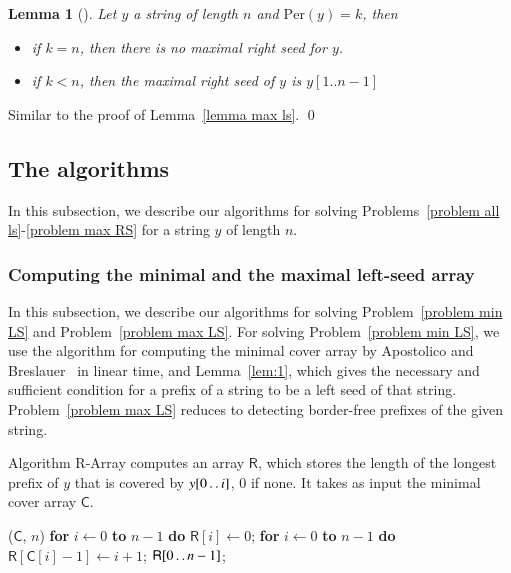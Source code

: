 \documentclass[preprint,12pt]{elsarticle}
\newcommand{\dd}{\mathinner{\ldotp\ldotp}}
\newcommand{\carr}{\textsf{C}}      %
\newcommand{\rarr}{\textsf{R}}      %
\newcommand{\Per}[1]{\ensuremath{\mathrm{Per}(#1)}}
\newtheorem{lemma}[theorem]{Lemma}
\newenvironment{proof}[1][Proof]{\begin{trivlist}
\item[\hskip \labelsep {\bfseries #1}]}{\end{trivlist}}
\begin{document}
\begin{lemma}[\cite{COCOON_2011}]
\label{lemma max rs}
Let $y$ a string of length $n$ and $\Per{y} = k$, then
\begin{itemize}
 \item if $k=n$, then there is no maximal right seed for $y$.
 \item if $k<n$, then the maximal right seed of $y$ is $y[1..n-1]$
\end{itemize}
\end{lemma}
\begin{proof}
Similar to the proof of Lemma~\ref{lemma max ls}. \qed
\end{proof}



\subsection{The algorithms}\label{sec:algorithms}

In this subsection, we describe our algorithms for solving Problems~\ref{problem all ls}-\ref{problem max RS} for a string $y$ of length $n$.

\subsubsection{Computing the minimal and the maximal left-seed array}

In this subsection, we describe our algorithms for solving Problem~\ref{problem min LS} and Problem~\ref{problem max LS}.
For solving Problem~\ref{problem min LS}, we use the algorithm for computing the minimal cover array by Apostolico and 
Breslauer~\cite{DBLP:conf/birthday/ApostolicoB97,DBLP:journals/ipl/Breslauer92} in linear time, and Lemma~\ref{lem:1}, which gives
the necessary and sufficient condition for a prefix of a string to be a left seed of that string.
Problem~\ref{problem max LS} reduces to detecting border-free prefixes of the given string.

Algorithm {\sc R-Array} computes an array $\rarr$, which stores the length of the longest prefix of $y$ that is covered
by $y[0\dd i]$, $0$ if none. It takes as input the minimal cover array $\carr$.

    \begin{algorithm}
      \begin{algorithmic}[1]
        ($\carr$, $n$)
        \STATE \textbf{for } $i\leftarrow0$ \textbf{to } $n-1$ \textbf{do }$\rarr[i]\leftarrow0$;
        \STATE \textbf{for } $i\leftarrow0$ \textbf{to } $n-1$ \textbf{do }$\rarr[\carr[i]-1] \leftarrow i+1$;
        \RETURN $\rarr[0 \dd n-1]$;
      \end{algorithmic}
    \end{algorithm}
\end{document}
